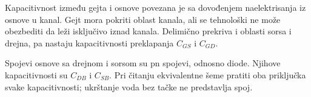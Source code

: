 Kapacitivnost između gejta i osnove povezana je sa dovođenjem naelektrisanja iz osnove u kanal. Gejt mora pokriti oblast kanala, ali se tehnološki ne može obezbediti da leži isključivo iznad kanala. Delimično prekriva i oblasti sorsa i drejna, pa nastaju kapacitivnosti preklapanja $C_{GS}$ i $C_{GD}$.

Spojevi osnove sa drejnom i sorsom su pn spojevi, odnosno diode. Njihove kapacitivnosti su $C_{DB}$ i $C_{SB}$. Pri čitanju ekvivalentne šeme pratiti oba priključka svake kapacitivnosti; ukrštanje voda bez tačke ne predstavlja spoj.
